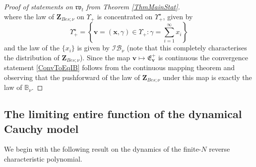\documentclass[]{article}
\begin{document}
\begin{proof}[Proof of statements on $\mathfrak{rv}_t$ from Theorem \ref{ThmMainStat}]
\begin{equation*}
\end{equation*}
where the law of $\mathbf{Z}_{Bes;\nu}$ on $\Upsilon_+$ is concentrated on $\Upsilon_+^\star$, given by 
\begin{equation*}
\Upsilon_+^\star=\left\{\boldsymbol{v}=(\mathbf{x},\gamma)\in \Upsilon_+: \gamma=\sum_{i=1}^\infty x_i\right\}
\end{equation*}
and the law of the $\{x_i\}$ is given by $\mathcal{IB}_\nu$ (note that this completely characterises the distribution of $\mathbf{Z}_{Bes;\nu}$).
Since the map $\boldsymbol{v}\mapsto \mathfrak{E}_{\boldsymbol{v}}^+$ is continuous the convergence statement \eqref{ConvToEqIB} follows from the continuous mapping theorem and observing that the pushforward of the law of $\mathbf{Z}_{Bes;\nu}$ under this map is exactly the law of $\mathbb{B}_{\nu}$.
\end{proof}



\subsection{The limiting entire function of the dynamical Cauchy model}


We begin with the following result on the  dynamics of the finite-$N$ reverse characteristic polynomial.
\end{document}
